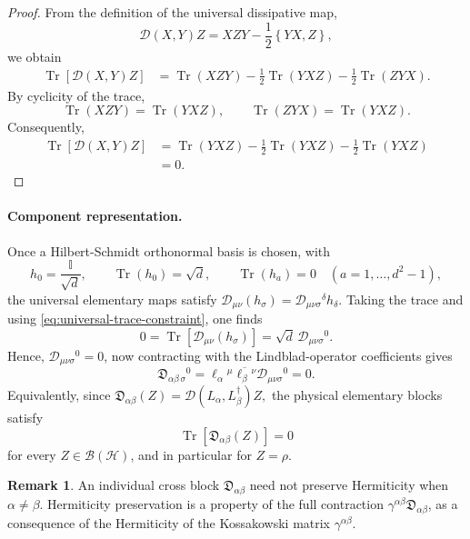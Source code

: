 \documentclass[notitlepage,aip,reprint,onecolumn]{revtex4-1}
\theoremstyle{definition}
\newtheorem{remark}[theorem]{Remark}
\newcommand{\acom}[2]{\left\{#1,#2\right\}}
\begin{document}
\begin{proof}
From the definition of the universal dissipative map,
\[
    \mathcal D(X,Y)Z
    =
    XZY
    -
    \frac12\acom{YX}{Z},
\]
we obtain
\begin{align*}
    \operatorname{Tr}\!\left[
    \mathcal D(X,Y)Z
    \right]
    &=
    \operatorname{Tr}(XZY)
    -
    \frac12\operatorname{Tr}(YXZ)
    -
    \frac12\operatorname{Tr}(ZYX).
\end{align*}
By cyclicity of the trace,
\[
    \operatorname{Tr}(XZY)
    =
    \operatorname{Tr}(YXZ),
    \qquad
    \operatorname{Tr}(ZYX)
    =
    \operatorname{Tr}(YXZ).
\]
Consequently,
\begin{align*}
    \operatorname{Tr}\!\left[
    \mathcal D(X,Y)Z
    \right]
    &=
    \operatorname{Tr}(YXZ)
    -
    \frac12\operatorname{Tr}(YXZ)
    -
    \frac12\operatorname{Tr}(YXZ)
    \\
    &=0.
\end{align*}
\end{proof}

\paragraph{Component representation.}
Once a Hilbert-Schmidt orthonormal basis is chosen, with
\[
    h_0=\frac{\mathbb I}{\sqrt d},
    \qquad
    \operatorname{Tr}(h_0)=\sqrt d,
    \qquad
    \operatorname{Tr}(h_a)=0
    \quad
    (a=1,\ldots,d^2-1),
\]
the universal elementary maps satisfy
\(
    \mathcal D_{\mu\nu}(h_\sigma)
    =
    \mathcal D_{\mu\nu\sigma}{}^\delta h_\delta.
\)
Taking the trace and using \eqref{eq:universal-trace-constraint}, one finds
\[
    0
    =
    \operatorname{Tr}
    \left[
    \mathcal D_{\mu\nu}(h_\sigma)
    \right]
    =
    \sqrt d\,
    \mathcal D_{\mu\nu\sigma}{}^0.
\]
Hence, \(\mathcal D_{\mu\nu\sigma}{}^0 = 0\), now contracting with the Lindblad-operator coefficients gives
\[
    \mathfrak{D}_{\alpha\beta\,\sigma}{}^0
    =
    \ell_\alpha{}^\mu
    \overline{\ell_\beta{}^\nu}
    \mathcal D_{\mu\nu\sigma}{}^0
    =
    0.
\]
Equivalently, since
\(
    \mathfrak{D}_{\alpha\beta}(Z)
    =
    \mathcal D(L_\alpha,L_\beta^\dagger)Z,
\)
the physical elementary blocks satisfy
\begin{equation*}
    \operatorname{Tr}\!\left[
    \mathfrak{D}_{\alpha\beta}(Z)
    \right]
    =
    0
\end{equation*}
for every \(Z\in\mathcal B(\mathcal H)\), and in particular for \(Z=\rho\).

\begin{remark}
An individual cross block \(\mathfrak{D}_{\alpha\beta}\) need not preserve Hermiticity when \(\alpha\neq\beta\). Hermiticity preservation is a property of the full contraction \(\gamma^{\alpha\beta}\mathfrak{D}_{\alpha\beta}\),  as a consequence of the Hermiticity of the Kossakowski matrix \(\gamma^{\alpha\beta}\).
\end{remark}
\end{document}
